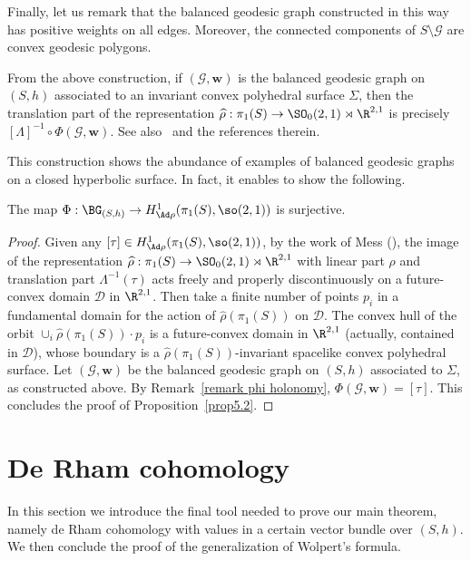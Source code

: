 Finally, let us remark that the balanced geodesic graph constructed in this way has positive weights on all edges. Moreover, the connected components of $S\setminus \mathcal G$ are convex geodesic polygons.

\begin{rema}\label{remark phi holonomy}
From the above construction, if $(\mathcal G,\mathbf w)$ is the balanced geodesic graph on $(S,h)$ associated to an invariant convex polyhedral surface $\Sigma$, then the translation part of the representation $\widehat \rho:\pi_1(S)\to \SO_0(2,1)\rtimes\R^{2,1}$ is precisely $[\Lambda]^{-1}\circ\Phi(\mathcal G,\mathbf w)$. {See also~\cite[Section~4.4]{Fillastre} and the references therein}.
\end{rema}

This construction shows the abundance of examples of balanced geodesic graphs on a closed hyperbolic surface. In fact, it enables to show the following.

\begin{prop}\label{prop5.2}
The map $\Phi:\BG_{(S,h)}\to H^1_{\Ad\rho}(\pi_1(S),\so(2,1))$ is surjective.
\end{prop}


\begin{proof}
Given any $[\tau]\in H^1_{\Ad\rho}(\pi_1(S),\so(2,1))$, by the work of Mess (\cite{mess}), the image of the representation $\widehat \rho:\pi_1(S)\to \SO_0(2,1)\rtimes\R^{2,1}$ with linear part $\rho$ and translation part $\Lambda^{-1}(\tau)$ acts freely and properly discontinuously on a future-convex domain $\mathcal D$ in $\R^{2,1}$. Then take a finite number of points $p_i$ in a fundamental domain for the action of $\widehat \rho(\pi_1(S))$ on $\mathcal D$. The convex hull of the orbit $\cup_i \widehat \rho(\pi_1(S))\cdot p_i$ is a future-convex domain in $\R^{2,1}$ (actually, contained in $\mathcal D$), whose boundary is a $\widehat \rho(\pi_1(S))$-invariant spacelike convex polyhedral surface. Let $(\mathcal G,\mathbf w)$ be the balanced geodesic graph on $(S,h)$ associated to $\Sigma$, as constructed above. By Remark~\ref{remark phi holonomy}, $\Phi(\mathcal G,\mathbf w)=[\tau]$. This concludes the proof of Proposition~\ref{prop5.2}.
\end{proof}


\section{De Rham cohomology}\label{sec de rham}

In this section we introduce the final tool needed to prove our main theorem, namely de Rham cohomology with values in a certain vector bundle over $(S,h)$. We then conclude the proof of the generalization of Wolpert's formula.

